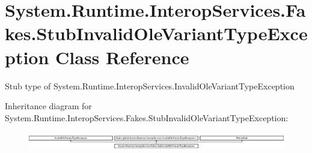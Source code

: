 \hypertarget{class_system_1_1_runtime_1_1_interop_services_1_1_fakes_1_1_stub_invalid_ole_variant_type_exception}{\section{System.\-Runtime.\-Interop\-Services.\-Fakes.\-Stub\-Invalid\-Ole\-Variant\-Type\-Exception Class Reference}
\label{class_system_1_1_runtime_1_1_interop_services_1_1_fakes_1_1_stub_invalid_ole_variant_type_exception}
}


Stub type of System.\-Runtime.\-Interop\-Services.\-Invalid\-Ole\-Variant\-Type\-Exception 


Inheritance diagram for System.\-Runtime.\-Interop\-Services.\-Fakes.\-Stub\-Invalid\-Ole\-Variant\-Type\-Exception\-:\begin{figure}[H]
\begin{center}
\leavevmode
\includegraphics[height=0.784314cm]{class_system_1_1_runtime_1_1_interop_services_1_1_fakes_1_1_stub_invalid_ole_variant_type_exception}
\end{center}
\end{figure}
